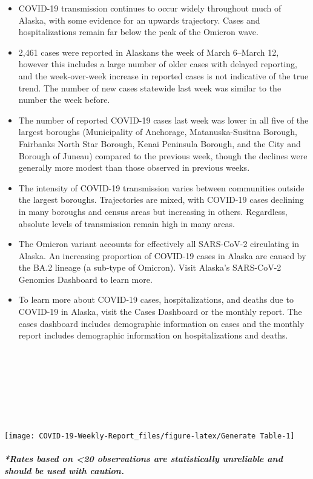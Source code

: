 \documentclass[
]{article}
\begin{document}
\begin{itemize}
\item
  COVID-19 transmission continues to occur widely throughout much of
  Alaska, with some evidence for an upwards trajectory. Cases and
  hospitalizations remain far below the peak of the Omicron wave.
\item
  2,461 cases were reported in Alaskans the week of March 6--March 12,
  however this includes a large number of older cases with delayed
  reporting, and the week-over-week increase in reported cases is not
  indicative of the true trend. The number of new cases statewide last
  week was similar to the number the week before.
\item
  The number of reported COVID-19 cases last week was lower in all five
  of the largest boroughs (Municipality of Anchorage, Matanuska-Susitna
  Borough, Fairbanks North Star Borough, Kenai Peninsula Borough, and
  the City and Borough of Juneau) compared to the previous week, though
  the declines were generally more modest than those observed in
  previous weeks.
\item
  The intensity of COVID-19 transmission varies between communities
  outside the largest boroughs. Trajectories are mixed, with COVID-19
  cases declining in many boroughs and census areas but increasing in
  others. Regardless, absolute levels of transmission remain high in
  many areas.
\item
  The Omicron variant accounts for effectively all SARS-CoV-2
  circulating in Alaska. An increasing proportion of COVID-19 cases in
  Alaska are caused by the BA.2 lineage (a sub-type of Omicron). Visit
  Alaska's SARS-CoV-2 Genomics Dashboard to learn more.
\item
  To learn more about COVID-19 cases, hospitalizations, and deaths due
  to COVID-19 in Alaska, visit the Cases Dashboard or the monthly
  report. The cases dashboard includes demographic information on cases
  and the monthly report includes demographic information on
  hospitalizations and deaths.
\end{itemize}

~

~

~

~

\begin{center}\texttt{[image: COVID-19-Weekly-Report\_files/figure-latex/Generate Table-1]} \end{center}

\hypertarget{rates-based-on-20-observations-are-statistically-unreliable-and-should-be-used-with-caution.}{%
\subparagraph{*Rates based on \textless20 observations are statistically
unreliable and should be used with
caution.}\label{rates-based-on-20-observations-are-statistically-unreliable-and-should-be-used-with-caution.}}
\end{document}
